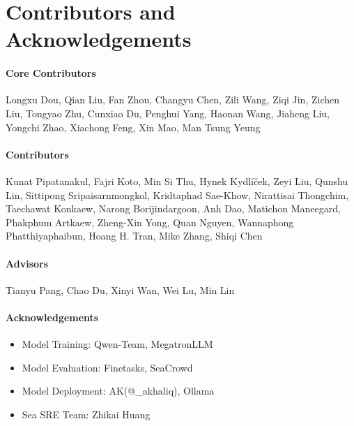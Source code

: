 \section*{Contributors and Acknowledgements}


\paragraph{Core Contributors}
Longxu Dou, Qian Liu, Fan Zhou, Changyu Chen, Zili Wang, Ziqi Jin, Zichen Liu, Tongyao Zhu, Cunxiao Du, Penghui Yang, Haonan Wang, Jiaheng Liu, Yongchi Zhao, Xiachong Feng, Xin Mao, Man Tsung Yeung

\paragraph{Contributors}
Kunat Pipatanakul, Fajri Koto, Min Si Thu, Hynek Kydlíček, Zeyi Liu, 
Qunshu Lin, Sittipong Sripaisarnmongkol, Kridtaphad Sae-Khow, 
Nirattisai Thongchim, Taechawat Konkaew, Narong Borijindargoon, Anh Dao, 
Matichon Maneegard, Phakphum Artkaew, Zheng-Xin Yong, Quan Nguyen, 
Wannaphong Phatthiyaphaibun, Hoang H. Tran, Mike Zhang, Shiqi Chen

\paragraph{Advisors}
Tianyu Pang, Chao Du, Xinyi Wan, Wei Lu, Min Lin


\paragraph{Acknowledgements}

\begin{itemize}
    \item Model Training: Qwen-Team, Megatron\-LLM
    \item Model Evaluation: Finetasks, SeaCrowd
    \item Model Deployment: AK(@\_akhaliq), Ollama
    \item Sea SRE Team: Zhikai Huang
\end{itemize}

